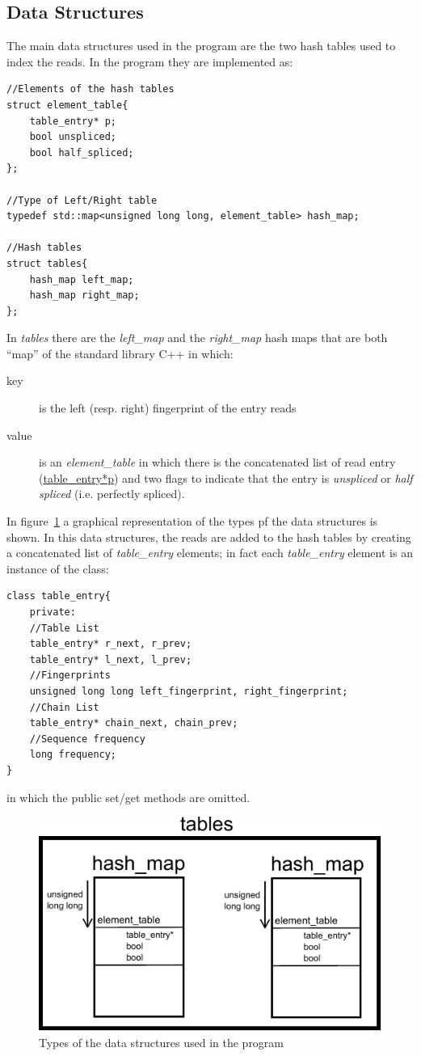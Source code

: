 \documentclass[11pt]{article}
\begin{document}
\subsection*{Data Structures}
The main data structures used in the program are the two hash tables
used to index the reads. In the program they are implemented as:
\begin{verbatim}
//Elements of the hash tables
struct element_table{
    table_entry* p;
    bool unspliced;
    bool half_spliced;
};

//Type of Left/Right table
typedef std::map<unsigned long long, element_table> hash_map;

//Hash tables
struct tables{
    hash_map left_map;
    hash_map right_map;
};
\end{verbatim}
In \emph{tables} there are the \emph{left\_map} and the
\emph{right\_map} hash maps that are both ``map'' of the standard
library C++ in which:
\begin{description}
\item[key] is the left (resp. right) fingerprint of the entry reads
\item[value] is an \emph{element\_table} in which there is the
concatenated list of read entry (\url{table_entry*p}) and two flags
to indicate that the entry is \emph{unspliced} or \emph{half spliced}
(i.e. perfectly spliced).
\end{description}

In figure~\ref{fig:types} a graphical representation of the types pf
the data structures is shown. In this data structures, the reads are
added to the hash tables by creating a concatenated list of
\emph{table\_entry} elements; in fact each \emph{table\_entry} element
is an instance of the class:
\begin{verbatim}
class table_entry{
    private:
    //Table List
    table_entry* r_next, r_prev;
    table_entry* l_next, l_prev;
    //Fingerprints
    unsigned long long left_fingerprint, right_fingerprint;
    //Chain List
    table_entry* chain_next, chain_prev;
    //Sequence frequency
    long frequency;
}
\end{verbatim}
in which the public set/get methods are omitted.

\begin{figure}[t]
\centering
\includegraphics[scale=1.5]{img/Types}
\caption{Types of the data structures used in the program}
\label{fig:types}
\end{figure}
\end{document}
